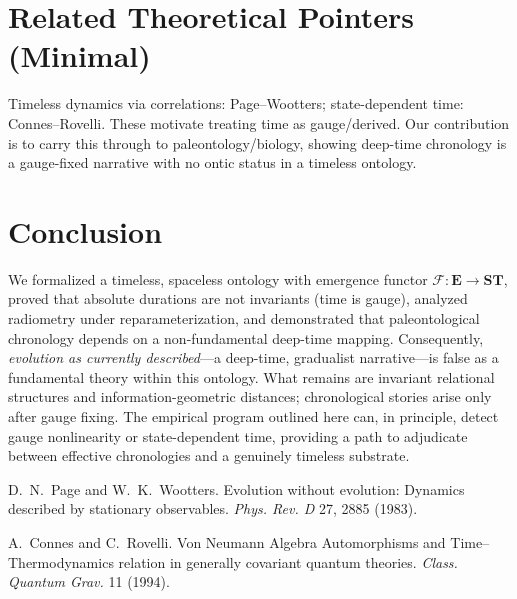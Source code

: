\documentclass[11pt]{article}
\theoremstyle{definition}
\theoremstyle{plain}
\theoremstyle{remark}
\newcommand{\Ecat}{\mathbf{E}}      %
\newcommand{\ST}{\mathbf{ST}}       %
\newcommand{\F}{\mathcal{F}}        %
\begin{document}
\section{Related Theoretical Pointers (Minimal)}
Timeless dynamics via correlations: Page--Wootters; state-dependent time: Connes--Rovelli. These motivate treating time as gauge/derived. Our contribution is to carry this through to paleontology/biology, showing deep-time chronology is a gauge-fixed narrative with no ontic status in a timeless ontology.

\section{Conclusion}
We formalized a timeless, spaceless ontology with emergence functor $\F:\Ecat\to\ST$, proved that absolute durations are not invariants (time is gauge), analyzed radiometry under reparameterization, and demonstrated that paleontological chronology depends on a non-fundamental deep-time mapping. Consequently, \emph{evolution as currently described}—a deep-time, gradualist narrative—is false as a fundamental theory within this ontology. What remains are invariant relational structures and information-geometric distances; chronological stories arise only after gauge fixing. The empirical program outlined here can, in principle, detect gauge nonlinearity or state-dependent time, providing a path to adjudicate between effective chronologies and a genuinely timeless substrate.


\begin{thebibliography}{9}

D.~N.~Page and W.~K.~Wootters.
\newblock Evolution without evolution: Dynamics described by stationary observables.
\newblock \emph{Phys. Rev. D} 27, 2885 (1983).

A.~Connes and C.~Rovelli.
\newblock Von Neumann Algebra Automorphisms and Time–Thermodynamics relation in generally covariant quantum theories.
\newblock \emph{Class. Quantum Grav.} 11 (1994).

\end{thebibliography}
\end{document}
